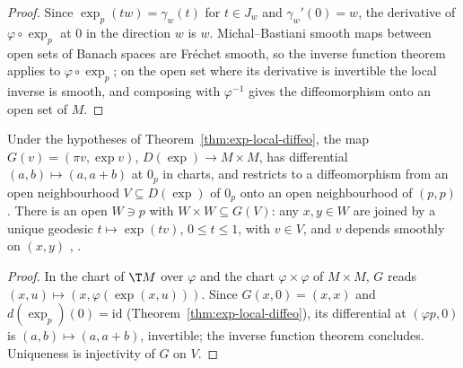 \begin{proof}
  \leanok
  Since $\exp_p(tw) = \gamma_w(t)$ for $t \in J_w$ and $\gamma_w'(0) = w$, the derivative of
  $\varphi \circ \exp_p$ at $0$ in the direction $w$ is $w$. Michal--Bastiani smooth maps between
  open sets of Banach spaces are Fr\'echet smooth, so the inverse function theorem applies to
  $\varphi \circ \exp_p$; on the open set where its derivative is invertible the local inverse is
  smooth, and composing with $\varphi^{-1}$ gives the diffeomorphism onto an open set of $M$.
\end{proof}

\begin{theorem}[$G = (\pi, \exp)$ is a local diffeomorphism at $0_p$
  {\cite[Prop.~VIII.5.1, p.~215]{Lan99}, \cite[\S6.2.1, p.~162]{Lar26}}]
  \label{thm:exp-pair-local-diffeo}
  \leanok
  Under the hypotheses of Theorem~\ref{thm:exp-local-diffeo}, the map
  $G(v) = (\pi v, \exp v)$, $D(\exp) \to M \times M$, has differential
  $(a, b) \mapsto (a, a + b)$ at $0_p$ in charts, and restricts to a diffeomorphism from an open
  neighbourhood $V \subseteq D(\exp)$ of $0_p$ onto an open neighbourhood of $(p, p)$. There is an
  open $W \ni p$ with $W \times W \subseteq G(V)$: any $x, y \in W$ are joined by a unique geodesic
  $t \mapsto \exp(tv)$, $0 \le t \le 1$, with $v \in V$, and $v$ depends smoothly on $(x, y)$
  \cite[Teo.~6.2.3 (1)]{Lar26}, \cite[Cor.~VIII.5.2 (1)]{Lan99}.
\end{theorem}

\begin{proof}
  \leanok
  In the chart of $\T M$ over $\varphi$ and the chart $\varphi \times \varphi$ of $M \times M$,
  $G$ reads $(x, u) \mapsto (x, \varphi(\exp(x, u)))$. Since $G(x, 0) = (x, x)$ and
  $d(\exp_p)(0) = \mathrm{id}$ (Theorem~\ref{thm:exp-local-diffeo}), its differential at
  $(\varphi p, 0)$ is $(a, b) \mapsto (a, a + b)$, invertible; the inverse function theorem
  concludes. Uniqueness is injectivity of $G$ on $V$.
\end{proof}

